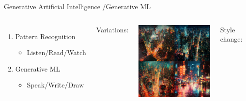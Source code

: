 \documentclass[aspectratio=169,xcolor=dvipsnames,svgnames,x11names,fleqn]{beamer}
\begin{document}
\begin{frame}{Generative Artificial Intelligence /Generative ML}
\begin{columns}
    \begin{enumerate}
    \item Pattern Recognition
    \begin{itemize}
        \item Listen/Read/Watch
    \end{itemize}
    \item Generative ML
    \begin{itemize}
        \item Speak/Write/Draw
    \end{itemize}
\end{enumerate}

    Variations:
    
        \vspace{2pt}
    
            \includegraphics[width=0.86\linewidth,trim=1cm 1.5cm 1cm 1.5cm,clip]{figures/genAI4.png}

   Style change:
   
        \vspace{2pt}
        

\end{columns}
\end{frame}
\end{document}

